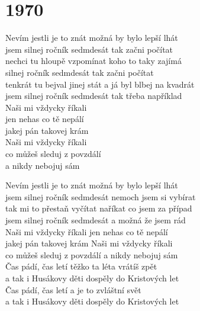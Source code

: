\section{1970}
\onehalfspacing

Nevím jestli je to znát 
možná by bylo lepší lhát \\
jsem silnej ročník sedmdesát 
tak začni počítat \\
nechci tu hloupě vzpomínat 
koho to taky zajímá \\
silnej ročník sedmdesát 
tak začni počítat \\
tenkrát tu bejval jinej stát 
a já byl blbej na kvadrát \\
jsem silnej ročník sedmdesát 
tak třeba například \\

{}Naši mi vždycky říkali \\
jen nehas co tě nepálí \\
jakej pán takovej krám \\
Naši mi vždycky říkali \\
co můžeš sleduj z povzdálí \\
a nikdy nebojuj sám\\

\singlespacing

\sloka{}
Nevím jestli je to znát 
možná by bylo lepší lhát \\
jsem silnej ročník sedmdesát 
nemoch jsem si vybírat \\
tak mi to přestaň vyčítat 
naříkat co jsem za případ \\
jsem silnej ročník sedmdesát 
a možná že jsem rád \\

Naši mi vždycky říkali 
jen nehas co tě nepálí \\
jakej pán takovej krám 
Naši mi vždycky říkali \\
co můžeš sleduj z povzdálí 
a nikdy nebojuj sám\\

\sloka{}
Čas pádí, čas letí 
těžko ta léta vrátíš zpět \\
a tak i Husákovy děti 
dospěly do Kristových let \\
Čas pádí, čas letí 
a je to zvláštní svět \\
a tak i Husákovy děti 
dospěly do Kristových let \\

